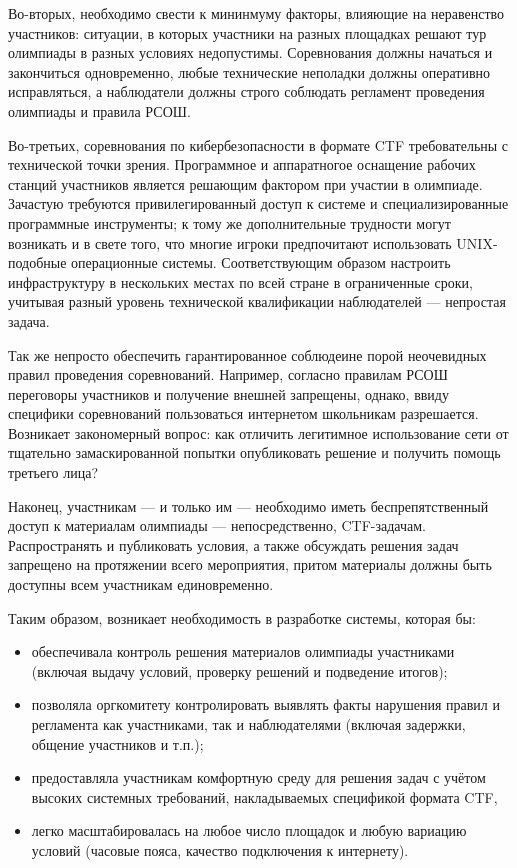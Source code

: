 Во-вторых, необходимо свести к мининмуму факторы, влияющие на неравенство участников: ситуации, в которых участники на разных площадках решают тур олимпиады в разных условиях недопустимы. Соревнования должны начаться и закончиться одновременно, любые технические неполадки должны оперативно исправляться, а наблюдатели должны строго соблюдать регламент проведения олимпиады и правила РСОШ.

Во-третьих, соревнования по кибербезопасности в формате CTF требовательны с технической точки зрения. Программное и аппаратногое оснащение рабочих станций участников является решающим фактором при участии в олимпиаде. Зачастую требуются привилегированный доступ к системе и специализированные программные инструменты; к тому же дополнительные трудности могут возникать и в свете того, что многие игроки предпочитают использовать UNIX-подобные операционные системы. Соответствующим образом настроить инфраструктуру в нескольких местах по всей стране в ограниченные сроки, учитывая разный уровень технической квалификации наблюдателей — непростая задача.

Так же непросто обеспечить гарантированное соблюдеине порой неочевидных правил проведения соревнований. Например, согласно правилам РСОШ переговоры участников и получение внешней запрещены, однако, ввиду специфики соревнований пользоваться интернетом школьникам разрешается. Возникает закономерный вопрос: как отличить легитимное использование сети от тщательно замаскированной попытки опубликовать решение и получить помощь третьего лица?

Наконец, участникам — и только им — необходимо иметь беспрепятственный доступ к материалам олимпиады — непосредственно, CTF-задачам. Распространять и публиковать условия, а также обсуждать решения задач запрещено на протяжении всего мероприятия, притом материалы должны быть доступны всем участникам единовременно.

Таким образом, возникает необходимость в разработке системы, которая бы:
\begin{itemize}
\item
  обеспечивала контроль решения материалов олимпиады участниками (включая выдачу условий, проверку решений и подведение итогов);
\item
  позволяла оргкомитету контролировать выявлять факты нарушения правил и регламента как участниками, так и наблюдателями (включая задержки, общение участников и т.п.);
\item
  предоставляла участникам комфортную среду для решения задач с учётом высоких системных требований, накладываемых спецификой формата CTF,
\item
  легко масштабировалась на любое число площадок и любую вариацию условий (часовые пояса, качество подключения к интернету).
\end{itemize}

